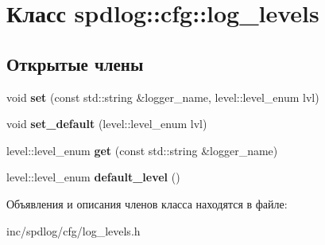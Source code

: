 \hypertarget{classspdlog_1_1cfg_1_1log__levels}{}\section{Класс spdlog\+:\+:cfg\+:\+:log\+\_\+levels}
\label{classspdlog_1_1cfg_1_1log__levels}
\subsection*{Открытые члены}
\begin{DoxyCompactItemize}
\item 
\mbox{\label{classspdlog_1_1cfg_1_1log__levels_ab283582b7d150d32257417b2a2a73d61}} 
void {\bfseries set} (const std\+::string \&logger\+\_\+name, level\+::level\+\_\+enum lvl)
\item 
\mbox{\label{classspdlog_1_1cfg_1_1log__levels_a0f15cde0f751a4903ea4d6f28351e1d3}} 
void {\bfseries set\+\_\+default} (level\+::level\+\_\+enum lvl)
\item 
\mbox{\label{classspdlog_1_1cfg_1_1log__levels_ae77cae795d2c0a39dbe9acf827395463}} 
level\+::level\+\_\+enum {\bfseries get} (const std\+::string \&logger\+\_\+name)
\item 
\mbox{\label{classspdlog_1_1cfg_1_1log__levels_af35282bc4f97a60afb8f8e9dfc0a5c5c}} 
level\+::level\+\_\+enum {\bfseries default\+\_\+level} ()
\end{DoxyCompactItemize}


Объявления и описания членов класса находятся в файле\+:\begin{DoxyCompactItemize}
\item 
inc/spdlog/cfg/log\+\_\+levels.\+h\end{DoxyCompactItemize}

